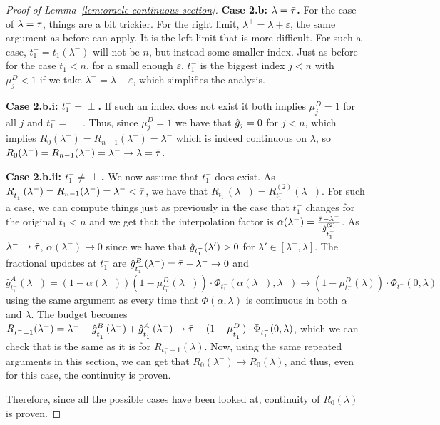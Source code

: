 \begin{proof}[Proof of Lemma~\ref{lem:oracle-continuous-section}]
    \smallskip
    \noindent\textbf{Case 2.b: $\lambda=\bar\tau$.}
    For the case of $\lambda=\bar\tau$, things are a bit trickier. For the right limit, $\lambda^+=\lambda+\varepsilon$, the same argument as before can apply. It is the left limit that is more difficult. For such a case, $t_1^-=t_1(\lambda^-)$ will not be $n$, but instead some smaller index. Just as before for the case $t_1<n$, for a small enough $\varepsilon$, $t_1^-$ is the biggest index $j<n$ with $\mu_j^D<1$ if we take $\lambda^-=\lambda-\varepsilon$, which simplifies the analysis.

    \smallskip
    \noindent\textbf{Case 2.b.i: $t_1^-=\perp$.}
    If such an index does not exist it both implies $\mu_j^D=1$ for all $j$ and $t_1^-=\perp$. Thus, since $\mu_j^D=1$ we have that $\hat{g}_j=0$ for $j<n$, which implies $R_0 (\lambda^-)= R_{n-1}(\lambda^-)=\lambda^-$ which is indeed continuous on $\lambda$, so $R_0(\lambda^-)= R_{n-1}(\lambda^-)=\lambda^-\to \lambda=\bar\tau$. 

    \smallskip
    \noindent\textbf{Case 2.b.ii: $t_1^-\neq \perp$.}
    We now assume that $t_1^-$ does exist. As $R_{t_1^-}(\lambda^-)=R_{n-1}(\lambda^-)=\lambda^-<\bar\tau$, we have that $R_{t_1^-}(\lambda^-)=R_{t_1^-}^{(2)}(\lambda^-)$. For such a case, we can compute things just as previously in the case that $t_1^-$ changes for the original $t_1<n$ and we get that the interpolation factor is $\alpha(\lambda^-) = \frac{\bar\tau - \lambda^-}{\hat{g}_{t_1^-}^{(2)}}$. 
    As $\lambda^- \to \bar\tau$, $\alpha(\lambda^-) \to 0$ since we have that $\hat{g}_{t_1^-}(\lambda')>0$ for $\lambda'\in[\lambda^-,\lambda]$. 
    The fractional updates at $t_1^-$ are $\hat{g}_{t_1^-}^B(\lambda^-) = \bar\tau - \lambda^- \to 0$ and $\hat{g}_{t_1^-}^A(\lambda^-) = (1 - \alpha(\lambda^-))(1 - \mu_{t_1^-}^D(\lambda^-)) \cdot \Phi_{t_1^-}(\alpha(\lambda^-),\lambda^-) \to (1 - \mu_{t_1^-}^D(\lambda)) \cdot \Phi_{t_1^-}(0, \lambda)$ using the same argument as every time that $\Phi(\alpha,\lambda)$ is continuous in both $\alpha$ and $\lambda$. 
    The budget becomes $R_{t_1^--1}(\lambda^-) = \lambda^- + \hat{g}_{t_1^-}^B(\lambda^-) + \hat{g}_{t_1^-}^A(\lambda^-) \to \bar\tau + (1 - \mu_{t_1^-}^D) \cdot \Phi_{t_1^-}(0,\lambda)$, which we can check that is the same as it is for $R_{t_1^--1}(\lambda)$. Now, using the same repeated arguments in this section, we can get that $R_0(\lambda^-)\to R_0(\lambda)$, and thus, even for this case, the continuity is proven.

    Therefore, since all the possible cases have been looked at, continuity of $R_0(\lambda)$ is proven.
\end{proof}
